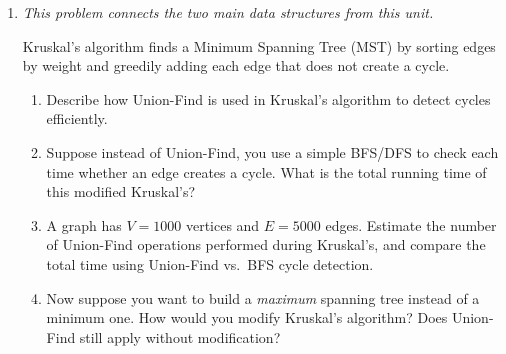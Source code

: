\documentclass[9pt]{book}
\begin{document}
\begin{enumerate}[label=\arabic*.]
A \textbf{decrease-key} operation takes a node $v$ in the heap and a new key $k' < \texttt{key}[v]$, updates the key, and restores the heap property.

\begin{enumerate}
    \item Describe how to implement \texttt{DecreaseKey} on a binary min-heap in $O(\log n)$ time. (Assume you have a direct pointer to $v$'s position in the heap.)
    \item In Dijkstra's algorithm on a graph with $V$ vertices and $E$ edges, how many \texttt{Insert} and \texttt{DecreaseKey} operations are performed in total? What is the total running time using a binary heap?
    \item Without a pointer into the heap, one common workaround is to use \emph{lazy deletion}: instead of updating an existing entry, insert a new entry with the smaller key and mark the old one as invalid. Describe this approach and analyze its time and space complexity for Dijkstra's algorithm.
\end{enumerate}

\item \textit{This problem connects the two main data structures from this unit.}

Kruskal's algorithm finds a Minimum Spanning Tree (MST) by sorting edges by weight and greedily adding each edge that does not create a cycle.

\begin{enumerate}
    \item Describe how Union-Find is used in Kruskal's algorithm to detect cycles efficiently.
    \item Suppose instead of Union-Find, you use a simple BFS/DFS to check each time whether an edge creates a cycle. What is the total running time of this modified Kruskal's?
    \item A graph has $V = 1000$ vertices and $E = 5000$ edges. Estimate the number of Union-Find operations performed during Kruskal's, and compare the total time using Union-Find vs.\ BFS cycle detection.
    \item Now suppose you want to build a \emph{maximum} spanning tree instead of a minimum one. How would you modify Kruskal's algorithm? Does Union-Find still apply without modification?
\end{enumerate}



\end{enumerate}
\end{document}
